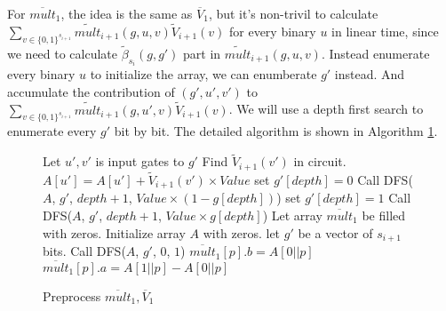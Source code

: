 For $\overline{mult}_1$, the idea is the same as $\overline{V}_1$, but it's non-trivil to calculate $\sum_{v\in \{0,1\}^{s_{i+1}}}\tilde{mult}_{i+1}(g, u, v)\tilde{V}_{i+1}(v)$ for every binary $u$ in linear time, since we need to calculate $\tilde{\beta}_{s_{i}}(g, g')$ part in $\tilde{mult}_{i+1}(g, u, v)$. Instead enumerate every binary $u$ to initialize the array, we can enumberate $g'$ instead. And accumulate the contribution of $(g', u', v')$ to $\sum_{v\in \{0,1\}^{s_{i+1}}}\tilde{mult}_{i+1}(g, u', v)\tilde{V}_{i+1}(v)$. We will use a depth first search to enumerate every $g'$ bit by bit. The detailed algorithm is shown in Algorithm \ref{alg::premult}.
\begin{figure}[p]
\begin{algorithm}[H]
\label{alg::premult}
\caption{Preprocess $\overline{mult}_1, \overline{V}_1$}
\begin{algorithmic}[1]
	 
		\State Let $u', v'$ is input gates to $g'$
		\State Find $\tilde{V}_{i+1}(v')$ in circuit.
		\State $A[u'] = A[u'] + \tilde{V}_{i+1}(v')\times Value$
	\Else
		\State set $g'[depth]=0$
		\State Call {\sf DFS}($A$, $g'$, $depth+1$, $Value\times(1-g[depth])$)
		\State set $g'[depth]=1$
		\State Call {\sf DFS}($A$, $g'$, $depth+1$, $Value\times g[depth]$)
	\EndIf
\EndProcedure
{}
	\State Let array $\overline{mult}_1$ be filled with zeros.
	\State Initialize array $A$ with zeros.
	\State let $g'$ be a vector of $s_{i+1}$ bits.
	\State Call {\sf DFS}($A$, $g'$, $0$, $1$)
		\State $\overline{mult}_1[p].b=A[0||p]$
		\State $\overline{mult}_1[p].a=A[1||p]-A[0||p]$
	\EndFor
\EndProcedure
\end{algorithmic}
\end{algorithm}
\end{figure}

